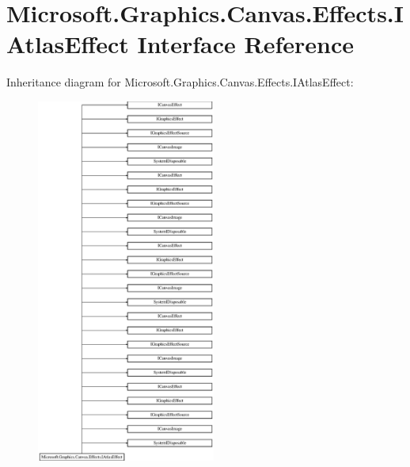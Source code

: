 \hypertarget{interface_microsoft_1_1_graphics_1_1_canvas_1_1_effects_1_1_i_atlas_effect}{}\section{Microsoft.\+Graphics.\+Canvas.\+Effects.\+I\+Atlas\+Effect Interface Reference}
\label{interface_microsoft_1_1_graphics_1_1_canvas_1_1_effects_1_1_i_atlas_effect}
Inheritance diagram for Microsoft.\+Graphics.\+Canvas.\+Effects.\+I\+Atlas\+Effect\+:\begin{figure}[H]
\begin{center}
\leavevmode
\includegraphics[height=12.000000cm]{interface_microsoft_1_1_graphics_1_1_canvas_1_1_effects_1_1_i_atlas_effect}
\end{center}
\end{figure}
